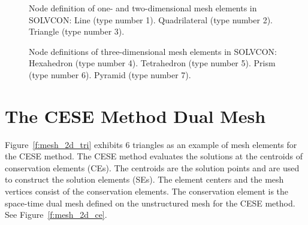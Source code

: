 \documentclass[11pt,dvips]{article}
\numberwithin{equation}{section}
\begin{document}
%
\begin{figure}[h]
\centering
{}

\caption{
%
Node definition of one- and two-dimensional mesh elements in SOLVCON:
%
 Line (type number 1).
%
 Quadrilateral (type number 2).
%
 Triangle (type number 3).
%
}

\label{f:elm2d}
\end{figure}
%

%
\begin{figure}[h]
\centering
{}

\caption{
%
Node definitions of three-dimensional mesh elements in SOLVCON:
%
 Hexahedron (type number 4).
%
 Tetrahedron (type number 5).
%
 Prism (type number 6).
%
 Pyramid (type number 7).
%
}

\label{f:elm3d}
\end{figure}
%

\clearpage
\section{The CESE Method Dual Mesh}
\label{s:cese_dual}

Figure~\ref{f:mesh_2d_tri} exhibits 6 triangles as an example of mesh elements
for the CESE method.  The CESE method evaluates the solutions at the centroids
of conservation elements (CEs).  The centroids are the solution points and are
used to construct the solution elements (SEs).  The element centers and the
mesh vertices consist of the conservation elements.  The conservation element
is the space-time dual mesh defined on the unstructured mesh for the CESE
method.  See Figure~\ref{f:mesh_2d_ce}.
\end{document}
